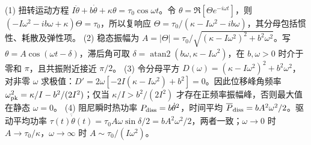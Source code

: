 (1) 扭转运动方程 \(I\ddot\theta+b\dot\theta+\kappa\theta=\tau_0\cos\omega t\)。令 \(\theta=\Re[\Theta e^{-i\omega t}]\)，则 \((-I\omega^2-ib\omega+\kappa)\Theta=\tau_0\)，所以复响应 \(\Theta=\tau_0/(\kappa-I\omega^2-ib\omega)\)，其分母包括惯性、耗散及弹性项。
(2) 稳态振幅为 \(A=|\Theta|=\tau_0/\sqrt{(\kappa-I\omega^2)^2+b^2\omega^2}\)。写 \(\theta=A\cos(\omega t-\delta)\)，滞后角可取 \(\delta=\operatorname{atan2}(b\omega,\kappa-I\omega^2)\)，在 \(b,\omega>0\) 时介于零和 \(\pi\)，且共振附近接近 \(\pi/2\)。
(3) 令分母平方 \(D(\omega)=(\kappa-I\omega^2)^2+b^2\omega^2\)，对非零 \(\omega\) 求极值：\(D'=2\omega[-2I(\kappa-I\omega^2)+b^2]=0\)。因此位移峰角频率 \(\omega_{\rm pk}^2=\kappa/I-b^2/(2I^2)\)；仅当 \(\kappa/I>b^2/(2I^2)\) 才存在正频率振幅峰，否则最大值在静态 \(\omega=0\)。
(4) 阻尼瞬时热功率 \(P_{\rm diss}=b\dot\theta^2\)，时间平均 \(\overline P_{\rm diss}=bA^2\omega^2/2\)。驱动平均功率 \(\overline{\tau(t)\dot\theta(t)}=\tau_0A\omega\sin\delta/2=bA^2\omega^2/2\)，两者一致；\(\omega\to0\) 时 \(A\to\tau_0/\kappa\)，\(\omega\to\infty\) 时 \(A\sim\tau_0/(I\omega^2)\)。
